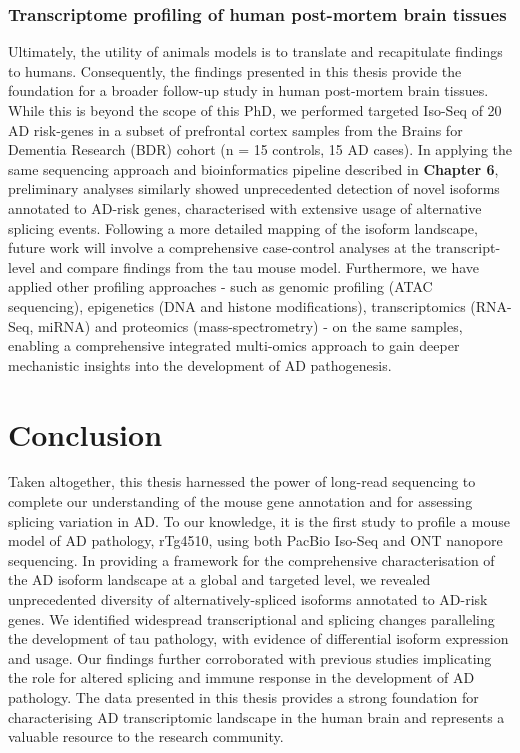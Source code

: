 \subsubsection{Transcriptome profiling of human post-mortem brain tissues}  
Ultimately, the utility of animals models is to translate and recapitulate findings to humans. Consequently, the findings presented in this thesis provide the foundation for a broader follow-up study in human post-mortem brain tissues. While this is beyond the scope of this PhD, we performed targeted Iso-Seq of 20 AD risk-genes in a subset of prefrontal cortex samples from the Brains for Dementia Research (BDR) cohort (n = 15 controls, 15 AD cases). In applying the same sequencing approach and bioinformatics pipeline described in \textbf{Chapter 6}, preliminary analyses similarly showed unprecedented detection of novel isoforms annotated to AD-risk genes, characterised with extensive usage of alternative splicing events. Following a more detailed mapping of the isoform landscape, future work will involve a comprehensive case-control analyses at the transcript-level and compare findings from the tau mouse model. Furthermore, we have applied other profiling approaches - such as genomic profiling (ATAC sequencing), epigenetics (DNA and histone modifications), transcriptomics (RNA-Seq, miRNA) and proteomics (mass-spectrometry) - on the same samples, enabling a comprehensive integrated multi-omics approach to gain deeper mechanistic insights into the development of AD pathogenesis.     

\section{Conclusion}
Taken altogether, this thesis harnessed the power of long-read sequencing to complete our understanding of the mouse gene annotation and for assessing splicing variation in AD. To our knowledge, it is the first study to profile a mouse model of AD pathology, rTg4510, using both PacBio Iso-Seq and ONT nanopore sequencing. In providing a framework for the comprehensive characterisation of the AD isoform landscape at a global and targeted level, we revealed unprecedented diversity of alternatively-spliced isoforms annotated to AD-risk genes. We identified widespread transcriptional and splicing changes paralleling the development of tau pathology, with evidence of differential isoform expression and usage. Our findings further corroborated with previous studies implicating the role for altered splicing and immune response in the development of AD pathology. The data presented in this thesis provides a strong foundation for characterising AD transcriptomic landscape in the human brain and represents a valuable resource to the research community.     